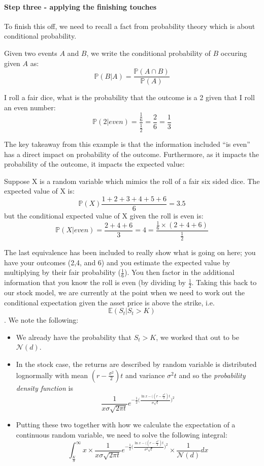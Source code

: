 \documentclass[../../Axiomathic.tex]{subfiles}
\begin{document}
\paragraph{Step three - applying the finishing touches}
To finish this off, we need to recall a fact from probability theory which is about conditional probability. 
\begin{nota}
Given two events $A$ and $B$, we write the conditional probability of $B$ occuring given $A$ as: \[\mathbb{P}(B \vert A)=\frac{\mathbb{P}(A \cap B)}{\mathbb{P}(A)}\]
\end{nota}
\begin{example}
I roll a fair dice, what is the probability that the outcome is a 2 given that I roll an even number:
\[\mathbb{P}(2 \vert even)=\frac{\frac{1}{6}}{\frac{1}{2}}=\frac{2}{6}=\frac{1}{3}\]
\end{example}
The key takeaway from this example is that the information included ``is even'' has a direct impact on probability of the outcome. Furthermore, as it impacts the probability of the outcome, it impacts the expected value: 
\begin{example}
Suppose X is a random variable which mimics the roll of a fair six sided dice. The expected value of X is: \[\mathbb{P}(X)\frac{1+2+3+4+5+6}{6} = 3.5\] but the conditional expected value of X given the roll is even is: \[\mathbb{P}(X \vert even) = \frac{2+4+6}{3}=4 = \frac{\frac{1}{6}\times (2+4+6)}{\frac{1}{2}}\]
\end{example}
The last equivalence has been included to really show what is going on here; you have your outcomes (2,4, and 6) and you estimate the expected value by multiplying by their fair probability ($\frac{1}{6}$). You then factor in the additional information that you know the roll is even (by dividing by $\frac{1}{2}$. Taking this back to our stock model, we are currently at the point when we need to work out the conditional expectation given the asset price is above the strike, i.e. \[\mathbb{E}(S_t \vert S_t>K)\]. 
We note the following:
\begin{itemize}
\item{We already have the probability that $S_t>K$, we worked that out to be $\mathcal{N}(d)$.}
\item{In the stock case, the returns are described by random variable is distributed lognormally with mean $(r-\frac{\sigma^2}{2})t$ and variance $\sigma^2t$ and so the \textit{probability density function} is \[\frac{1}{x \sigma \sqrt{2\pi t}}e^{-\frac{1}{2}\biggl (\frac{\ln x - ((r-\frac{\sigma^2}{2})t}{\sigma\sqrt t}\biggr)^2} \]}
\item{Putting these two together with how we calculate the expectation of a continuous random variable, we need to solve the following integral:
\[\int_{\frac{K}{S}}^\infty x \times \frac{1}{x \sigma \sqrt{2\pi t}}e^{-\frac{1}{2}\biggl (\frac{\ln x - ((r-\frac{\sigma^2}{2})t}{\sigma^2\sqrt t}\biggr)^2} \times \frac{1}{\mathcal{N}(d)} dx \]}
\end{itemize}
\end{document}
